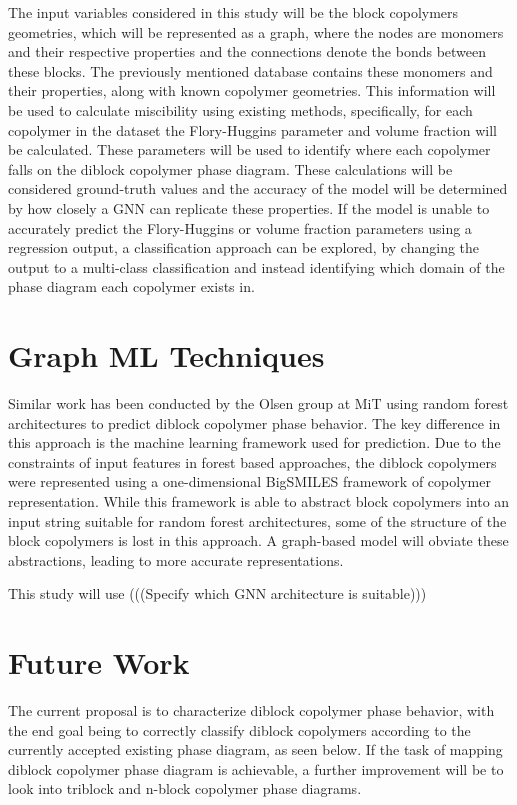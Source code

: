 \documentclass{article}
\begin{document}
The input variables considered in this study will be the block copolymers geometries, which will be represented as a graph, where the nodes are monomers and their respective properties and the connections denote the bonds between these blocks. The previously mentioned database contains these monomers and their properties, along with known copolymer geometries. This information will be used to calculate miscibility using existing methods, specifically, for each copolymer in the dataset the Flory-Huggins parameter and volume fraction will be calculated. These parameters will be used to identify where each copolymer falls on the diblock copolymer phase diagram. These calculations will be considered ground-truth values and the accuracy of the model will be determined by how closely a GNN can replicate these properties. If the model is unable to accurately predict the Flory-Huggins or volume fraction parameters using a regression output, a classification approach can be explored, by changing the output to a multi-class classification and instead identifying which domain of the phase diagram each copolymer exists in.

\section{Graph ML Techniques}

Similar work has been conducted by the Olsen group at MiT\cite{RandForest} using random forest architectures to predict diblock copolymer phase behavior. The key difference in this approach is the machine learning framework used for prediction. Due to the constraints of input features in forest based approaches, the diblock copolymers were represented using a one-dimensional BigSMILES\cite{BigSMILES} framework of copolymer representation. While this framework is able to abstract block copolymers into an input string suitable for random forest architectures, some of the structure of the block copolymers is lost in this approach. A graph-based model will obviate these abstractions, leading to more accurate representations.

This study will use (((Specify which GNN architecture is suitable)))

\section{Future Work}
The current proposal is to characterize diblock copolymer phase behavior, with the end goal being to correctly classify diblock copolymers according to the currently accepted existing phase diagram, as seen below. If the task of mapping diblock copolymer phase diagram is achievable, a further improvement will be to look into triblock and n-block copolymer phase diagrams.
\end{document}
